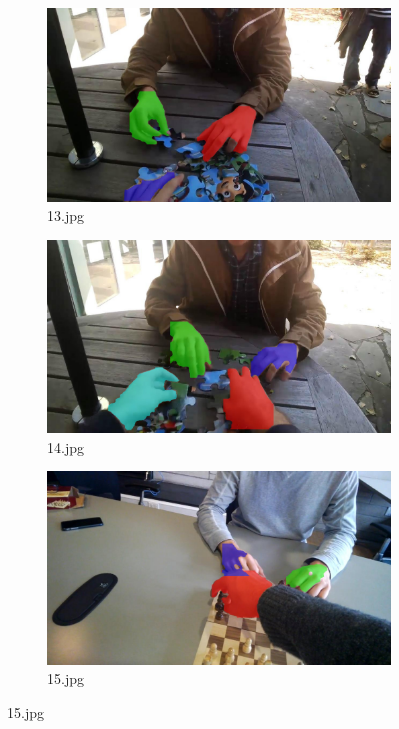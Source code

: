 \begin{figure}[!h]
\begin{subfigure}[b]{0.3\textwidth}
    \end{subfigure}

        \begin{subfigure}[b]{0.3 \textwidth}
        \centering
        \includegraphics[width=\textwidth]{images/handSegmentation/13.jpg}
        \caption{13.jpg}
        
    \end{subfigure}
    \hfill
    \begin{subfigure}[b]{0.3\textwidth}
        \centering
        \includegraphics[width=\textwidth]{images/handSegmentation/14.jpg}
        \caption{14.jpg}
        
    \end{subfigure}
    \hfill
    \begin{subfigure}[b]{0.3\textwidth}
        \centering
        \includegraphics[width=\textwidth]{images/handSegmentation/15.jpg}
        \caption{15.jpg}
       

\end{subfigure}
\end{figure}
